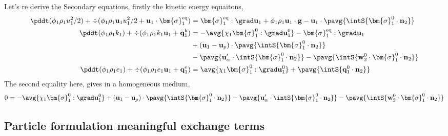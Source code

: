 Let's re derive the Secondary equations, firstly the kinetic energy equaitons, 
\begin{align*}
    \pddt (\phi_1 \rho_1u_1^2/2)  
    + \div (
        \phi_1 \rho_1\textbf{u}_1u_1^2/2
        + \textbf{u}_1 \cdot \bm{\sigma}_1^\text{eq}
    )
    &= 
     \bm{\sigma}_1^\text{eq} : \grad \textbf{u}_1
    + \phi_1 \rho_1 \textbf{u}_1\cdot \textbf{g} 
    -  \textbf{u}_1\cdot 
        \pavg{\intS{\bm{\sigma}_1^0 \cdot \textbf{n}_2}} 
        \\
    \pddt (\phi_1\rho_1k_1)  
    + \div (
        \phi_1\rho_1k_1\textbf{u}_1
        + \textbf{q}_1^\text{k} 
        )
    &= 
    - \avg{\chi_1\bm{\sigma}_1^0 : \grad \textbf{u}_1^0}
    - \bm{\sigma}_1^\text{eq} : \grad \textbf{u}_1\\
    &+ (\textbf{u}_1 - \textbf{u}_p)
    \cdot \pavg{\intS{\bm{\sigma}_1^0 \cdot \textbf{n}_2}}\\
    &- \pavg{ \textbf{u}_\alpha' \cdot \intS{  \bm{\sigma}_1^0 \cdot \textbf{n}_2}}
    - \pavg{ \intS{\textbf{w}_2^0 \cdot \bm{\sigma}_1^0 \cdot \textbf{n}_2}} 
    \\
    \pddt (\phi_1\rho_1e_1)  
    + \div (
        \phi_1 \rho_1e_1\textbf{u}_1
        +
        \textbf{q}_1^\text{e} 
        )
    &= 
    \avg{\chi_1\bm{\sigma}_1^0 : \grad \textbf{u}_1^0}
    + \pavg{\intS{\textbf{q}_1^0 \cdot \textbf{n}_2}} 
\end{align*}
The second equality here, gives in a homogeneous medium, 
\begin{equation*}
    0 =
    - \avg{\chi_1\bm{\sigma}_1^0 : \grad \textbf{u}_1^0}
    + (\textbf{u}_1 - \textbf{u}_p)
    \cdot \pavg{\intS{\bm{\sigma}_1^0 \cdot \textbf{n}_2}}
    - \pavg{ \textbf{u}_\alpha' \cdot \intS{  \bm{\sigma}_1^0 \cdot \textbf{n}_2}}
    - \pavg{ \intS{\textbf{w}_2^0 \cdot \bm{\sigma}_1^0 \cdot \textbf{n}_2}} 
\end{equation*}
\subsection*{Particle formulation meaningful exchange terms}

